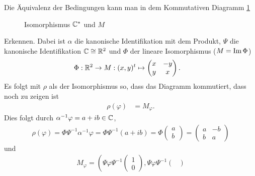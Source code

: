 \documentclass[ngerman]{report}
\begin{document}
    \begin{answer}
        Die Äquivalenz der Bedingungen kann man in dem Kommutativen Diagramm \cref{fig:kommutatives_diagramm}
        \begin{figure}
            \centering
            \caption{Isomorphismus $\mathbb{C}^\ast$ und $M$}
            \label{fig:kommutatives_diagramm}        
        \end{figure}
        Erkennen. Dabei ist $\alpha$ die kanonische Identifikation mit dem Produkt, $\Psi$ die kanonische Identifikation $\mathbb{C}\cong \mathbb{R}^2$ und $\Phi$ der lineare Isomorphismus ($M = \operatorname{\text{Im}}\Phi$)
        \begin{align*}
            \Phi: \mathbb{R}^2 &\to M: (x,y)^t\mapsto \begin{pmatrix}
                x & -y\\
                y & x
            \end{pmatrix}.
        \end{align*}
        Es folgt mit $\rho$ als der Isomorphismus so, dass das Diagramm kommutiert, dass noch zu zeigen ist
        \begin{align*}
            \rho(\varphi) &= M_\varphi.
        \end{align*}
        Dies folgt durch $\alpha^{-1} \varphi = a+ib\in\mathbb{C}$,
        \begin{align*}
            \rho(\varphi) = \Phi \Psi^{-1}\alpha^{-1}\varphi = \Phi \Psi^{-1}(a+ib) = \Phi
            \begin{pmatrix}
                a\\
                b
            \end{pmatrix}
             = \begin{pmatrix}
                a & -b\\
                b & a
            \end{pmatrix}
        \end{align*} 
        und
        \begin{align*}
            M_\varphi = \left(\Psi \varphi\Psi^{-1}\begin{pmatrix}
                1\\
                0
            \end{pmatrix},\Psi \varphi\Psi^{-1}\begin{pmatrix}

\end{pmatrix}
\end{align*}
\end{answer}
\end{document}
